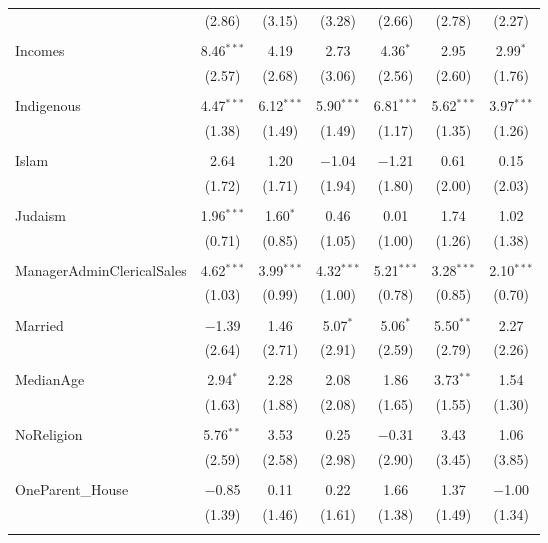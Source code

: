 \documentclass[openany]{book}
\begin{document}
\begin{table}[!htbp]
\begin{tabular}{@{\extracolsep{1pt}}lcccccc}
  & (2.86) & (3.15) & (3.28) & (2.66) & (2.78) & (2.27) \\ 
  & & & & & & \\ 
 Incomes & 8.46$^{***}$ & 4.19 & 2.73 & 4.36$^{*}$ & 2.95 & 2.99$^{*}$ \\ 
  & (2.57) & (2.68) & (3.06) & (2.56) & (2.60) & (1.76) \\ 
  & & & & & & \\ 
 Indigenous & 4.47$^{***}$ & 6.12$^{***}$ & 5.90$^{***}$ & 6.81$^{***}$ & 5.62$^{***}$ & 3.97$^{***}$ \\ 
  & (1.38) & (1.49) & (1.49) & (1.17) & (1.35) & (1.26) \\ 
  & & & & & & \\ 
 Islam & 2.64 & 1.20 & $-$1.04 & $-$1.21 & 0.61 & 0.15 \\ 
  & (1.72) & (1.71) & (1.94) & (1.80) & (2.00) & (2.03) \\ 
  & & & & & & \\ 
 Judaism & 1.96$^{***}$ & 1.60$^{*}$ & 0.46 & 0.01 & 1.74 & 1.02 \\ 
  & (0.71) & (0.85) & (1.05) & (1.00) & (1.26) & (1.38) \\ 
  & & & & & & \\ 
 ManagerAdminClericalSales & 4.62$^{***}$ & 3.99$^{***}$ & 4.32$^{***}$ & 5.21$^{***}$ & 3.28$^{***}$ & 2.10$^{***}$ \\ 
  & (1.03) & (0.99) & (1.00) & (0.78) & (0.85) & (0.70) \\ 
  & & & & & & \\ 
 Married & $-$1.39 & 1.46 & 5.07$^{*}$ & 5.06$^{*}$ & 5.50$^{**}$ & 2.27 \\ 
  & (2.64) & (2.71) & (2.91) & (2.59) & (2.79) & (2.26) \\ 
  & & & & & & \\ 
 MedianAge & 2.94$^{*}$ & 2.28 & 2.08 & 1.86 & 3.73$^{**}$ & 1.54 \\ 
  & (1.63) & (1.88) & (2.08) & (1.65) & (1.55) & (1.30) \\ 
  & & & & & & \\ 
 NoReligion & 5.76$^{**}$ & 3.53 & 0.25 & $-$0.31 & 3.43 & 1.06 \\ 
  & (2.59) & (2.58) & (2.98) & (2.90) & (3.45) & (3.85) \\ 
  & & & & & & \\ 
 OneParent\_House & $-$0.85 & 0.11 & 0.22 & 1.66 & 1.37 & $-$1.00 \\ 
  & (1.39) & (1.46) & (1.61) & (1.38) & (1.49) & (1.34) \\ 
  & & & & & & \\ 

\end{tabular}
\end{table}
\end{document}
